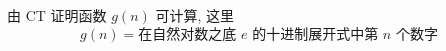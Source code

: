\begin{problem}
由 CT 证明函数 $g(n)$ 可计算, 这里
\[
g(n) = \text{在自然对数之底 $e$ 的十进制展开式中第 $n$ 个数字}
\]
\end{problem}
